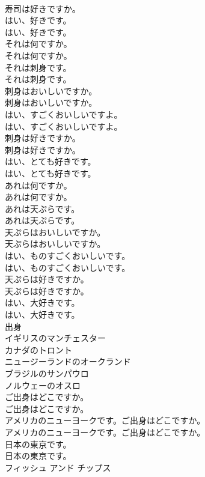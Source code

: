 \documentclass[8pt]{extreport}
\begin{document}
\begin{CJK}{UTF8}{min}
\\	寿司は好きですか。 
\\	はい、好きです。	
\\	はい、好きです。 
\\	それは何ですか。	
\\	それは何ですか。 
\\	それは刺身です。	
\\	それは刺身です。 
\\	刺身はおいしいですか。	
\\	刺身はおいしいですか。 
\\	はい、すごくおいしいですよ。	
\\	はい、すごくおいしいですよ。 
\\	刺身は好きですか。	
\\	刺身は好きですか。 
\\	はい、とても好きです。	
\\	はい、とても好きです。 
\\	あれは何ですか。	
\\	あれは何ですか。 
\\	あれは天ぷらです。	
\\	あれは天ぷらです。 
\\	天ぷらはおいしいですか。	
\\	天ぷらはおいしいですか。 
\\	はい、ものすごくおいしいです。	
\\	はい、ものすごくおいしいです。 
\\	天ぷらは好きですか。	
\\	天ぷらは好きですか。 
\\	はい、大好きです。	
\\	はい、大好きです。 
\\	出身
\\	イギリスのマンチェスター
\\	カナダのトロント
\\	ニュージーランドのオークランド
\\	ブラジルのサンパウロ
\\	ノルウェーのオスロ
\\	ご出身はどこですか。	
\\	ご出身はどこですか。 
\\	アメリカのニューヨークです。ご出身はどこですか。	
\\	アメリカのニューヨークです。ご出身はどこですか。 
\\	日本の東京です。	
\\	日本の東京です。 
\\	フィッシュ アンド チップス

\end{CJK}
\end{document}
